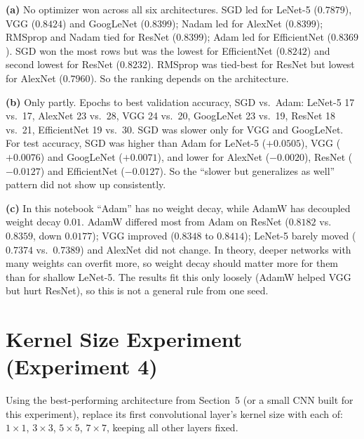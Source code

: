 \documentclass[12pt,a4paper]{article}
\begin{document}
\begin{answerbox}
\textbf{(a)} No optimizer won across all six architectures. SGD led for LeNet-5 ($0.7879$), VGG ($0.8424$) and
GoogLeNet ($0.8399$); Nadam led for AlexNet ($0.8399$); RMSprop and Nadam tied for ResNet ($0.8399$); Adam led
for EfficientNet ($0.8369$). SGD won the most rows but was the lowest for EfficientNet ($0.8242$) and second
lowest for ResNet ($0.8232$). RMSprop was tied-best for ResNet but lowest for AlexNet ($0.7960$). So the ranking
depends on the architecture.\par
\textbf{(b)} Only partly. Epochs to best validation accuracy, SGD vs.\ Adam: LeNet-5 17 vs.\ 17, AlexNet 23 vs.\ 28,
VGG 24 vs.\ 20, GoogLeNet 23 vs.\ 19, ResNet 18 vs.\ 21, EfficientNet 19 vs.\ 30. SGD was slower only for VGG and
GoogLeNet. For test accuracy, SGD was higher than Adam for LeNet-5 ($+0.0505$), VGG ($+0.0076$) and GoogLeNet
($+0.0071$), and lower for AlexNet ($-0.0020$), ResNet ($-0.0127$) and EfficientNet ($-0.0127$). So the
``slower but generalizes as well'' pattern did not show up consistently.\par
\textbf{(c)} In this notebook ``Adam'' has no weight decay, while AdamW has decoupled weight decay $0.01$. AdamW
differed most from Adam on ResNet ($0.8182$ vs.\ $0.8359$, down $0.0177$); VGG improved ($0.8348$ to $0.8414$);
LeNet-5 barely moved ($0.7374$ vs.\ $0.7389$) and AlexNet did not change. In theory, deeper networks with many
weights can overfit more, so weight decay should matter more for them than for shallow LeNet-5. The results fit
this only loosely (AdamW helped VGG but hurt ResNet), so this is not a general rule from one seed.
\end{answerbox}

\section{Kernel Size Experiment (Experiment 4)}

Using the best-performing architecture from Section~5 (or a small CNN built for this
experiment), replace its first convolutional layer's kernel size with each of:
$1\times1$, $3\times3$, $5\times5$, $7\times7$, keeping all other layers fixed.
\end{document}
